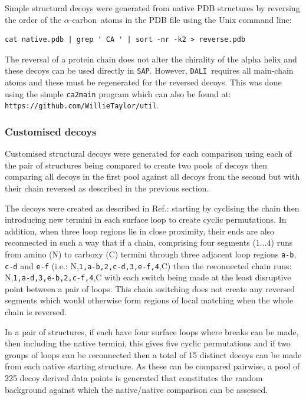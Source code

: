 \documentclass[preprint,12pt]{elsarticle}
\newcommand{\CA}{$\alpha$-carbon}
\newcommand{\SAP}{{\tt SAP}}
\newcommand{\DALI}{{\tt DALI}}
\begin{document}
Simple structural decoys were generated from native PDB structures by reversing the order
of the \CA\ atoms in the PDB file using the Unix command line:
\begin{verbatim}
cat native.pdb | grep ' CA ' | sort -nr -k2 > reverse.pdb
\end{verbatim}
The reversal of a protein chain does not alter the chirality of the alpha helix and
these decoys can be used directly in \SAP.   However, \DALI\ requires all main-chain atoms
and these must be regenerated for the reversed decoys.   This was done using the simple
{\tt ca2main} program which can also be found at: {\tt https://github.com/WillieTaylor/util}.

\subsubsection{Customised decoys}

Customised structural decoys were generated for each comparison using each of the
pair of structures being compared to create two pools of decoys then comparing all
decoys in the first pool against all decoys from the second but with their chain
reversed as described in the previous section.

The decoys were created as described in Ref.\cite{TaylorWR06a}: starting by cyclising the
chain then introducing new termini in each surface loop to create cyclic permutations.
In addition, when three loop regions lie in close proximity, their ends are also
reconnected in such a way that if a chain, comprising four segments ($1\ldots4$) runs 
from amino (N) to carboxy (C) termini through three adjacent loop regions {\tt a-b},
{\tt c-d} and {\tt e-f} (i.e.: N,{\tt 1,a-b,2,c-d,3,e-f,4},C) then the reconnected chain
runs: N,{\tt 1,a-d,3,e-b,2,c-f,4},C with each switch being made at the least disruptive
point between a pair of loops.   This chain switching does not create any reversed segments
which would otherwise form regions of local matching when the whole chain is reversed.

In a pair of structures, if each have four surface loops where breaks can be made, then
including the native termini, this gives five cyclic permutations and if two groups of
loops can be reconnected then a total of 15 distinct decoys can be made from each native
starting structure.   As these can be compared pairwise, a pool of 225 decoy derived
data points is generated that constitutes the random background against which the native/native
comparison can be assessed.
\end{document}
